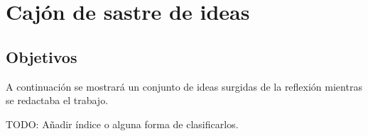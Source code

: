 
\chapter{Cajón de sastre de ideas}
\section{Objetivos}  
A continuación se mostrará un conjunto de ideas surgidas de la 
reflexión mientras se redactaba el trabajo.  

TODO: Añadir índice o alguna forma de clasificarlos. 